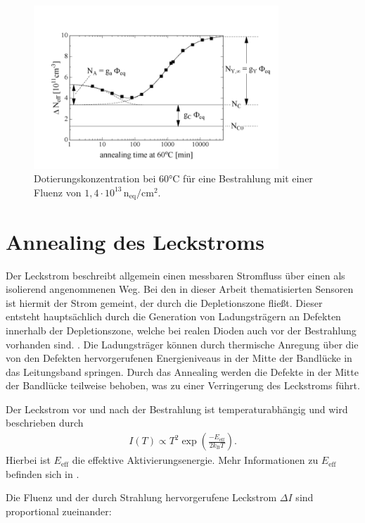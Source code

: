 \begin{figure}
  \centering
  \includegraphics[width=0.82\textwidth]{logos/n_eff_beispiel.PNG}
  \caption{Dotierungskonzentration bei 60°C für eine Bestrahlung mit einer Fluenz von
  $1,4\cdot 10^{13} \, \mathrm{n_{eq}/cm^2}$.\cite{moll}}
  \label{fig:n_eff_beispiel}
\end{figure}



\section{Annealing des Leckstroms}
Der Leckstrom beschreibt allgemein einen messbaren Stromfluss über einen als isolierend
angenommenen Weg. Bei den in dieser Arbeit thematisierten Sensoren ist hiermit der Strom gemeint, der durch die
Depletionszone fließt. Dieser entsteht hauptsächlich durch die Generation von Ladungsträgern an Defekten
innerhalb der Depletionszone, welche
bei realen Dioden auch vor der Bestrahlung vorhanden sind. \cite{moll}.
Die Ladungsträger können durch thermische Anregung über die von den Defekten hervorgerufenen Energieniveaus
in der Mitte der Bandlücke in das Leitungsband springen.
Durch das Annealing werden die Defekte in der Mitte der Bandlücke teilweise behoben,
was zu einer Verringerung des Leckstroms führt.

Der Leckstrom vor und nach der Bestrahlung ist temperaturabhängig und wird
beschrieben durch
\begin{align}
  I(T) \propto T^2 \exp{\left(\frac{-E_{\mathrm{eff}}}{2 k_{\mathrm{B}}T}\right)} \label{eqn:Chilingarov_2013}.
\end{align}
Hierbei ist $E_{\mathrm{eff}}$ die  effektive Aktivierungsenergie. Mehr Informationen zu $E_{\mathrm{eff}}$ befinden sich in \cite{Chilingarov_2013}.

Die Fluenz und der durch Strahlung hervorgerufene Leckstrom $\Delta I$ sind
proportional zueinander:


